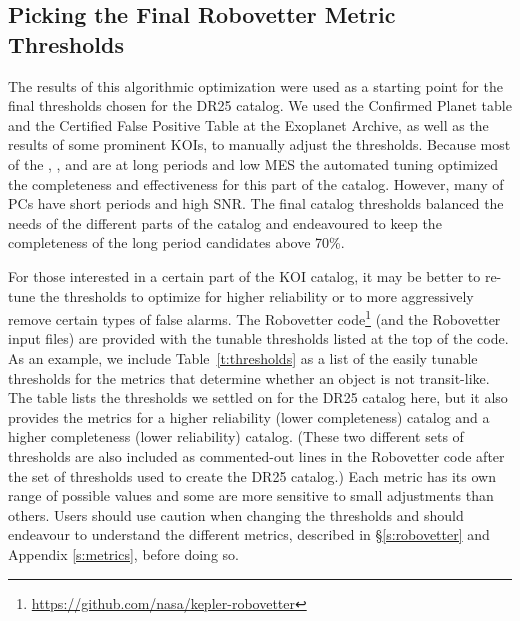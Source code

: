 \subsection{Picking the Final Robovetter Metric Thresholds}

The results of this algorithmic optimization were used as a starting point for the final thresholds chosen for the DR25 catalog. We used the Confirmed Planet table and the Certified False Positive Table at the Exoplanet Archive, as well as the results of some prominent KOIs, to manually adjust the thresholds.  Because most of the , , and  are at long periods and low MES the automated tuning optimized the completeness and effectiveness for this part of the catalog. However, many of  PCs have short periods and high SNR. The final catalog thresholds balanced the needs of the different parts of the catalog and endeavoured to keep the completeness of the long period candidates above 70\%.

For those interested in a certain part of the KOI catalog, it may be better to re-tune the thresholds to optimize for higher reliability or to more aggressively remove certain types of false alarms.   The Robovetter code\footnote{\url{https://github.com/nasa/kepler-robovetter}} (and the Robovetter input files) are provided with the tunable thresholds listed at the top of the code.  As an example, we include Table~\ref{t:thresholds} as a list of the easily tunable thresholds for the metrics that determine whether an object is not transit-like.  The table lists the thresholds we settled on for the DR25 catalog here, but it also provides the metrics for a higher reliability (lower completeness) catalog and a higher completeness (lower reliability) catalog. (These two different sets of thresholds are also included as commented-out lines in the Robovetter code after the set of thresholds used to create the DR25 catalog.) Each metric has its own range of possible values and some are more sensitive to small adjustments than others.  Users should use caution when changing the thresholds and should endeavour to understand the different metrics, described in \S\ref{s:robovetter} and Appendix \ref{s:metrics}, before doing so.




